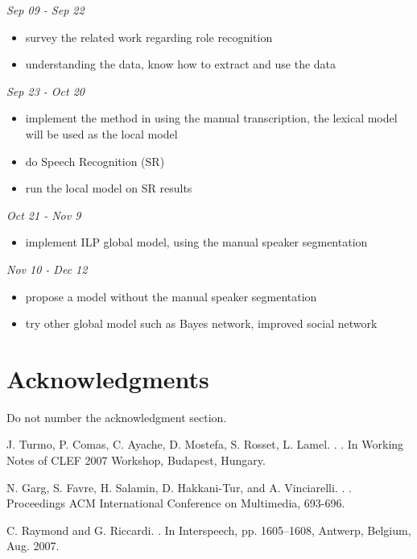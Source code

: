 \documentclass[11pt,letterpaper]{article}
\begin{document}
\noindent \emph{Sep 09 - Sep 22}
\begin{itemize}
  \item survey the related work regarding role recognition
  \item understanding the data, know how to extract and use the data
\end{itemize}

\noindent \emph{Sep 23 -  Oct 20}
\begin{itemize}
  \item implement the method in \cite{Garg:2008} using the manual transcription, the lexical model will be used as the local model
  \item do Speech Recognition (SR)
  \item run the local model on SR results
\end{itemize}

\noindent \emph{Oct 21 - Nov 9}
\begin{itemize}
  \item implement ILP global model, using the manual speaker segmentation
\end{itemize}

\noindent \emph{Nov 10 - Dec 12}
\begin{itemize}
  \item propose a model without the manual speaker segmentation
  \item try other global model such as Bayes network, improved social network
\end{itemize}

\section*{Acknowledgments}

Do not number the acknowledgment section.

\begin{thebibliography}{}
J. Turmo, P. Comas, C. Ayache, D. Mostefa, S. Rosset, L. Lamel.
.
.
\newblock In Working Notes of CLEF 2007 Workshop, Budapest, Hungary.

N. Garg, S. Favre, H. Salamin, D. Hakkani-Tur, and A. Vinciarelli. 
. 
.
\newblock Proceedings ACM International Conference on Multimedia, 693-696.

C. Raymond and G. Riccardi. 
. 
\newblock In Interspeech, pp. 1605–1608, Antwerp, Belgium, Aug. 2007. 

\end{thebibliography}
\end{document}
